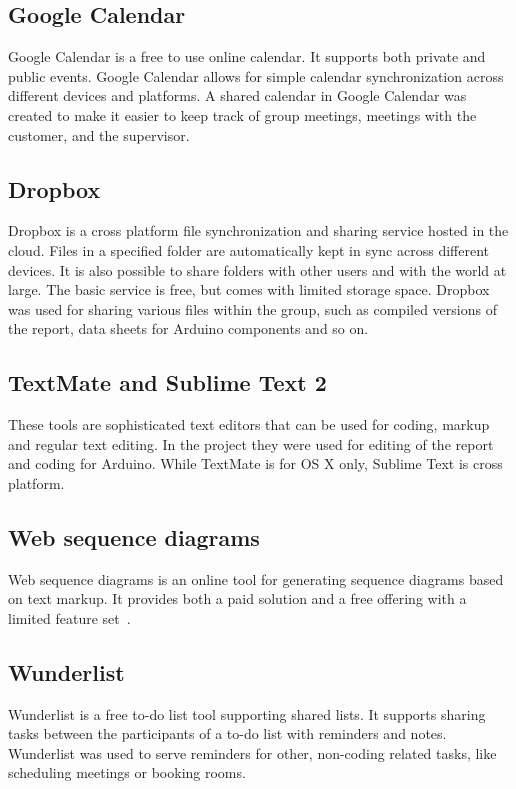 \subsection{Google Calendar}
Google Calendar is a free to use online calendar. It supports both private and public events. Google Calendar allows for simple calendar synchronization across different devices and platforms. A shared calendar in Google Calendar was created to make it easier to keep track of group meetings, meetings with the customer, and the supervisor.

\subsection{Dropbox}
Dropbox is a cross platform file synchronization and sharing service hosted in the cloud. Files in a specified folder are automatically kept in sync across different devices. It is also possible to share folders with other users and with the world at large. The basic service is free, but comes with limited storage space. Dropbox was used for sharing various files within the group, such as compiled versions of the report, data sheets for Arduino components and so on.

\subsection{TextMate and Sublime Text 2}
These tools are sophisticated text editors that can be used for coding, markup and regular text editing. In the project they were used for editing of the report and coding for Arduino. While TextMate is for OS X only, Sublime Text is cross platform.

\subsection{Web sequence diagrams}
Web sequence diagrams is an online tool for generating sequence diagrams based on text markup. It provides
both a paid solution and a free offering with a limited feature set~\cite{websequencediagrams}.

\subsection{Wunderlist}
Wunderlist is a free to-do list tool supporting shared lists. It supports sharing tasks between the participants of a to-do list with reminders and notes. Wunderlist was used to serve reminders for other, non-coding related tasks, like scheduling meetings or booking rooms.

